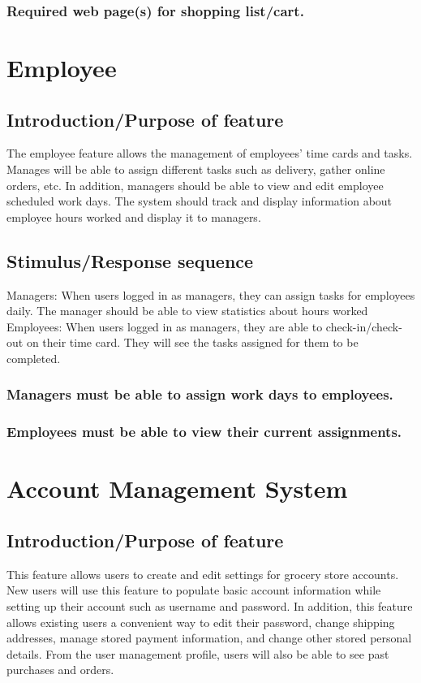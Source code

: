 \documentclass{scrreprt}
\begin{document}
\subsubsection[]{\normalfont Required web page(s) for shopping list/cart.}

\section{Employee}
\subsection{Introduction/Purpose of feature}
The employee feature allows the management of employees’ time cards and tasks. Manages will be able to assign different tasks such as delivery, gather online orders, etc.  In addition, managers should be able to view and edit employee scheduled work days.  The system should track and display information about employee hours worked and display it to managers.


\subsection{Stimulus/Response sequence}
Managers:
When users logged in as managers, they can assign tasks for employees daily.  The manager should be able to view statistics about hours worked
Employees:
When users logged in as managers, they are able to check-in/check-out on their time card. They will see the tasks assigned for them to be completed.

\subsubsection[]{\normalfont Managers must be able to assign work days to employees.}
\subsubsection[]{\normalfont Employees must be able to view their current assignments.}


\section{Account Management System}
\subsection{Introduction/Purpose of feature}
This feature allows users to create and edit settings for grocery store accounts.  New users will use this feature to populate basic account information while setting up their account such as username and password.  In addition, this feature allows existing users a convenient way to edit their password, change shipping addresses, manage stored payment information, and change other stored personal details.  From the user management profile, users will also be able to see past purchases and orders.
\end{document}
